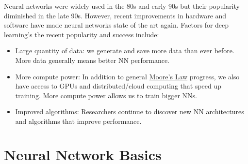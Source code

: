 Neural networks were widely used in the 80s and early 90s but their popularity diminished in the late 90s. However, recent improvements in hardware and software have made neural networks state of the art again. Factors for deep learning's the recent popularity and success include:
\begin{itemize}
	\item Large quantity of data: we generate and save more data than ever before. More data generally means better NN performance.
	\item More compute power: In addition to general \href{https://en.wikipedia.org/wiki/Moore%27s_law}{Moore's Law} progress, we also have access to GPUs and distributed/cloud computing that speed up training. More compute power allows us to train bigger NNs. 
	\item Improved algorithms: Researchers continue to discover new NN architectures and algorithms that improve performance.
\end{itemize}
\section{Neural Network Basics}


